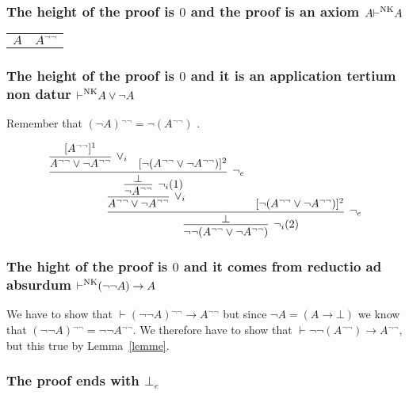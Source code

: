 \documentclass[english]{smfart}
\theoremstyle{plain}
\begin{document}
\subsubsection{The height of the proof is  $0$ and the proof is an axiom  $A{\vdash}^{\mbox{\textsc{nk}}} A$}

\begin{center}
\begin{tabular}{c@{$\quad\leadsto\quad$}c}
$A$ & $A{^{\lnot\lnot}}$ \\
\end{tabular}
\end{center}

\subsubsection{The height of the proof is $0$  and it is an application tertium non datur  ${\vdash}^{\mbox{\textsc{nk}}} A\lor \lnot A$}

Remember that $(\lnot A){^{\lnot\lnot}}=\lnot(A{^{\lnot\lnot}})$ . 

$$
\infer[\lnot_i(2)]{\lnot\lnot (A{^{\lnot\lnot}} \lor \lnot A{^{\lnot\lnot}})}{
   \infer[\lnot_e]{\bot}{
      \infer[\lor_i]{A{^{\lnot\lnot}} \lor \lnot A{^{\lnot\lnot}}}{
         \infer[\lnot_i(1)]{\lnot A{^{\lnot\lnot}}}{
            \infer[\lnot_e]{\bot}{
               \infer[\lor_i]{A{^{\lnot\lnot}} \lor \lnot A{^{\lnot\lnot}}}{
                  [A{^{\lnot\lnot}}]^1
               }
            & [\lnot (A{^{\lnot\lnot}} \lor \lnot A{^{\lnot\lnot}})]^2
            }
         }
      }
    & [\lnot (A{^{\lnot\lnot}} \lor \lnot A{^{\lnot\lnot}})]^2
   }
}
$$

\subsubsection{The hight of the proof is  $0$ and it comes from  reductio ad absurdum ${\vdash}^{\mbox{\textsc{nk}}} (\lnot \lnot A)\rightarrow A$}

We have to show that ${\vdash} (\lnot\lnot A){^{\lnot\lnot}} \rightarrow A{^{\lnot\lnot}}$ but since $\lnot A=(A\rightarrow \bot)$ 
we know that  $(\lnot\lnot A){^{\lnot\lnot}}=\lnot\lnot A{^{\lnot\lnot}}$. We therefore have
to show that  ${\vdash} \lnot\lnot (A{^{\lnot\lnot}}) \rightarrow A{^{\lnot\lnot}}$, but this true by Lemma~\ref{lemme}. 

\subsubsection{The proof ends with $\bot_e$}
\end{document}
